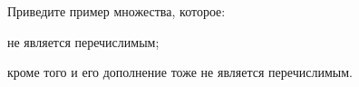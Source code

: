 Приведите пример множества, которое:
\begin{enumcyr}
    \item не является перечислимым;
    \item кроме того и его дополнение тоже не является перечислимым.
\end{enumcyr}